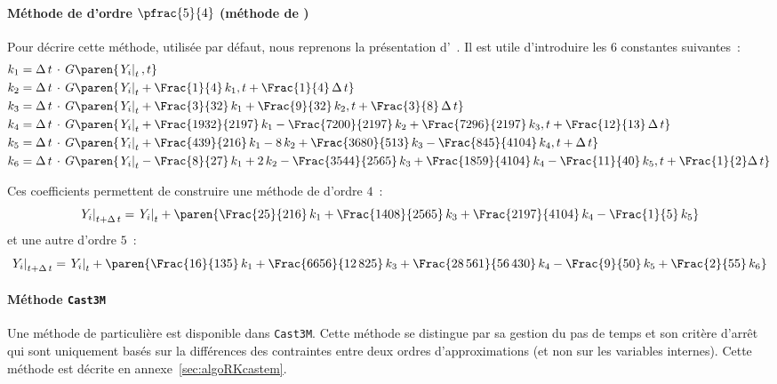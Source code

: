 \documentclass[rectoverso,pleiades,pstricks,leqno,anti]{texmf/note_technique_2010}
\newcommand{\castem}{\texttt{Cast3M}}
\newcommand{\debutpas}[1]{\ensuremath{\left.#1\right|_{t}}}
\newcommand{\finpas}[1]{\ensuremath{\left.#1\right|_{t+\Delta\, t}}}
\begin{document}
\paragraph{Méthode de  d'ordre $\pfrac{5}{4}$ (méthode
  de )} Pour décrire cette méthode, utilisée par défaut,
nous reprenons la présentation d'~\cite{fortin01:_analy}.
Il est utile d'introduire les \(6\) constantes suivantes~:
\[
\begin{aligned}
  k_{1} &= \Delta\,t\,\cdot\,G\paren{\debutpas{Y_{i}},t} \\
  k_{2} &=
  \Delta\,t\,\cdot\,G\paren{\debutpas{Y_{i}}+\Frac{1}{4}\,k_{1},t+\Frac{1}{4}\,\Delta\,t}\\
 k_{3} &=
  \Delta\,t\,\cdot\,G\paren{\debutpas{Y_{i}}+\Frac{3}{32}\,k_{1}+\Frac{9}{32}\,k_{2},t+\Frac{3}{8}\,\Delta\,t}
 \\
  k_{4} &=
  \Delta\,t\,\cdot\,G\paren{\debutpas{Y_{i}}+\Frac{1932}{2197}\,k_{1}-\Frac{7200}{2197}\,k_{2}+\Frac{7296}{2197}\,k_{3},t+\Frac{12}{13}\,\Delta\,t}\\
 k_{5} &=
  \Delta\,t\,\cdot\,G\paren{\debutpas{Y_{i}}+\Frac{439}{216}\,k_{1}-8\,k_{2}+\Frac{3680}{513}\,k_{3}-\Frac{845}{4104}\,k_{4},t+\Delta\,t}\\
 k_{6} &=
  \Delta\,t\,\cdot\,G\paren{\debutpas{Y_{i}}-\Frac{8}{27}\,k_{1}+2\,k_{2}-\Frac{3544}{2565}\,k_{3}+\Frac{1859}{4104}\,k_{4}-\Frac{11}{40}\,k_{5},t+\Frac{1}{2}\Delta\,t}\\
\end{aligned}
\]

Ces coefficients permettent de construire une méthode de
 d'ordre \(4\)~:
\[
\finpas{Y_{i}}=\debutpas{Y_{i}}+\paren{\Frac{25}{216}\,k_{1}+\Frac{1408}{2565}\,k_{3}+\Frac{2197}{4104}\,k_{4}-\Frac{1}{5}\,k_{5}}
\]
et une autre d'ordre \(5\)~:
\[
\finpas{Y_{i}}=\debutpas{Y_{i}}+\paren{\Frac{16}{135}\,k_{1}+\Frac{6656}{12\,825}\,k_{3}+\Frac{28\,561}{56\,430}\,k_{4}-\Frac{9}{50}\,k_{5}+\Frac{2}{55}\,k_{6}}
\]

\paragraph{Méthode \castem{}} Une méthode de 
particulière est disponible dans \castem{}. Cette méthode se distingue
par sa gestion du pas de temps et son critère d'arrêt qui sont
uniquement basés sur la différences des contraintes entre deux ordres
d'approximations (et non sur les variables internes). Cette méthode est
décrite en annexe~\ref{sec:algoRKcastem}.
\end{document}
